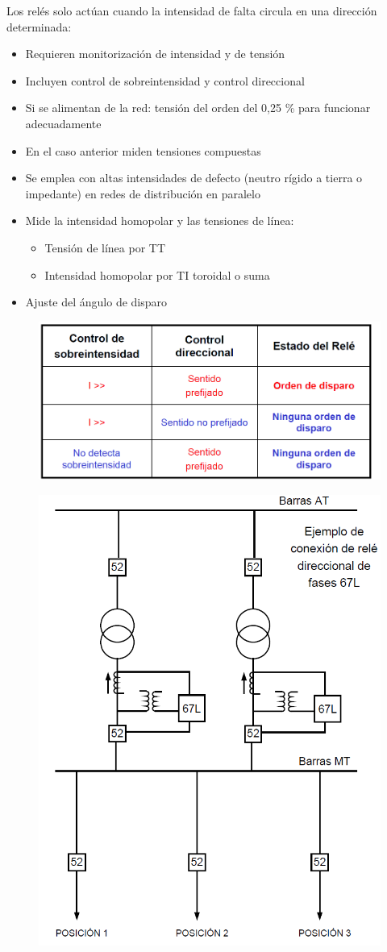 Los relés solo actúan cuando la intensidad de falta circula en una dirección determinada:
\begin{itemize}
	\item Requieren monitorización de intensidad y de tensión
	\item Incluyen control de sobreintensidad y control direccional
	\item Si se alimentan de la red: tensión del orden del 0,25 \% para funcionar adecuadamente
	\item En el caso anterior miden tensiones compuestas
	\item Se emplea con altas intensidades de defecto (neutro rígido a tierra o impedante) en redes de distribución en paralelo
	\item Mide la intensidad homopolar y las tensiones de línea:
	\begin{itemize}
		\item Tensión de línea por TT
		\item Intensidad homopolar por TI toroidal o suma
	\end{itemize}
	\item Ajuste del ángulo de disparo
\end{itemize}
\begin{figure}[H]
	\centering
	\includegraphics[width=0.5\linewidth]{Images/66}
	\label{fig:66}
\end{figure}

\begin{figure}[H]
	\centering
	\includegraphics[width=0.3\linewidth]{Images/65}
	\label{fig:65}
\end{figure}
